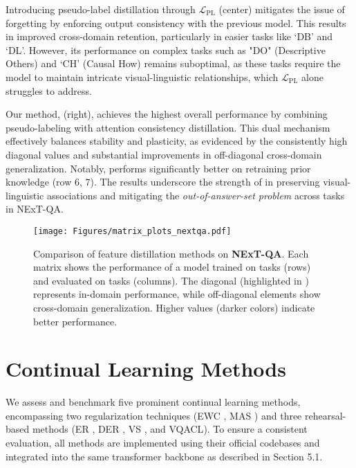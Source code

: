 Introducing pseudo-label distillation through $\mathcal{L}_{\text{PL}}$ (center) mitigates the issue of forgetting by enforcing output consistency with the previous model. This results in improved cross-domain retention, particularly in easier tasks like `DB' and `DL'. However, its performance on complex tasks such as "DO" (Descriptive Others) and `CH' (Causal How) remains suboptimal, as these tasks require the model to maintain intricate visual-linguistic relationships, which $\mathcal{L}_{\text{PL}}$ alone struggles to address.

Our method, \qstmethodshort{} (right), achieves the highest overall performance by combining pseudo-labeling with attention consistency distillation. This dual mechanism effectively balances stability and plasticity, as evidenced by the consistently high diagonal values and substantial improvements in off-diagonal cross-domain generalization. Notably, \qstmethodshort{} performs significantly better on retraining prior knowledge (row 6, 7). The results underscore the strength of \qstmethodshort{} in preserving visual-linguistic associations and mitigating the \textit{out-of-answer-set problem} across tasks in NExT-QA.

\begin{figure*}
    \centering
    \texttt{[image: Figures/matrix\_plots\_nextqa.pdf]}
    \caption{Comparison of feature distillation methods on \textbf{NExT-QA}. Each matrix shows the performance of a model trained on tasks (rows) and evaluated on tasks (columns). The diagonal (highlighted in {\color{orange}{orange}}) represents in-domain performance, while off-diagonal elements show cross-domain generalization. Higher values (darker colors) indicate better performance.}
    \label{fig:cross_task_generalization_nextqa}
\end{figure*}

\section{Continual Learning Methods}
\label{explain_methods}
We assess and benchmark five prominent continual learning methods, encompassing two regularization techniques (EWC \citep{kirkpatrick2017overcoming}, MAS \citep{mas2018}) and three rehearsal-based methods (ER \citep{chaudhry2019tinyepisodicmemoriescontinual}, DER \citep{Chaudhry2019er}, VS \citep{Wan_2022_CVPR}, and VQACL\citep{zhang2023vqacl}). To ensure a consistent evaluation, all methods are implemented using their official codebases and integrated into the same transformer backbone as described in Section 5.1. 

